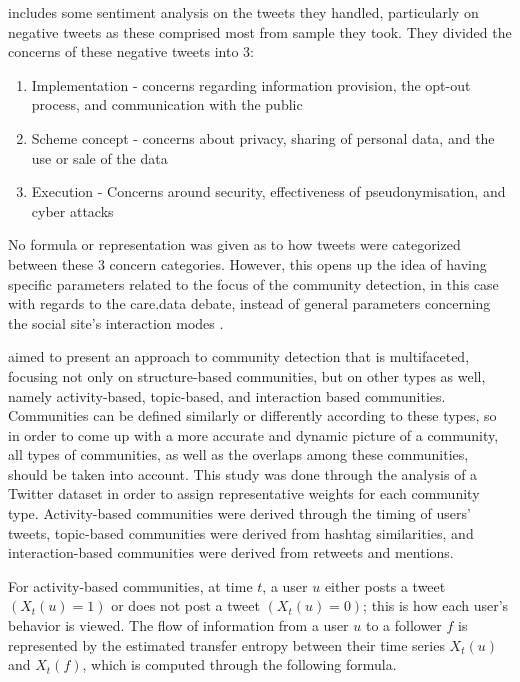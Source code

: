  includes some sentiment analysis on the tweets they handled, particularly on negative tweets as these comprised most from sample they took. They divided the concerns of these negative tweets into 3:

\begin{enumerate}
	\item Implementation - concerns regarding information provision, the opt-out process, and communication with the public
	\item Scheme concept - concerns about privacy, sharing of personal data, and the use or sale of the data
	\item Execution - Concerns around security, effectiveness of pseudonymisation, and cyber attacks
	
\end{enumerate}

No formula or representation was given as to how tweets were categorized between these 3 concern categories. However, this opens up the idea of having specific parameters related to the focus of the community detection, in this case with regards to the care.data debate, instead of general parameters concerning the social site’s interaction modes \cite{Amor:2015}.

 aimed to present an approach to community detection that is multifaceted, focusing not only on structure-based communities, but on other types as well, namely activity-based, topic-based, and interaction based communities. Communities can be defined similarly or differently according to these types, so in order to come up with a more accurate and dynamic picture of a community, all types of communities, as well as the overlaps among these communities, should be taken into account. This study was done through the analysis of a Twitter dataset in order to assign representative weights for each community type. Activity-based communities were derived through the timing of users' tweets, topic-based communities were derived from hashtag similarities, and interaction-based communities were derived from retweets and mentions.

For activity-based communities, at time $t$, a user $u$ either posts a tweet $(X_{t}(u) = 1)$ or does not post a tweet $(X_{t}(u) = 0)$; this is how each user’s behavior is viewed. The flow of information from a user $u$ to a follower $f$ is represented by the estimated transfer entropy between their time series $X_{t}(u)$ and $X_{t}(f)$, which is computed through the following formula.

